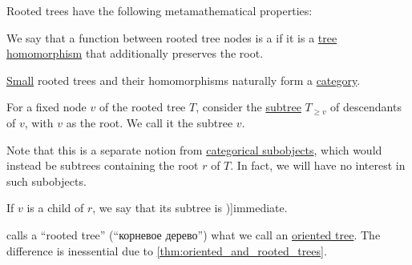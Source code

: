 \begin{definition}
  Rooted trees have the following metamathematical properties:
  \begin{thmenum}[resume=def:rooted_tree]
    \mimprovised We say that a function between rooted tree nodes is a  if it is a \hyperref[def:tree/morphism]{tree homomorphism} that additionally preserves the root.

     \hyperref[def:small_set]{Small} rooted trees and their homomorphisms naturally form a \hyperref[def:category]{category}.

     For a fixed node \( v \) of the rooted tree \( T \), consider the \hyperref[def:tree/subobject]{subtree} \( T_{\geq v} \) of descendants of \( v \), with \( v \) as the root. We call it the subtree  \( v \).

    Note that this is a separate notion from \hyperref[def:categorical_subobject]{categorical subobjects}, which would instead be subtrees containing the root \( r \) of \( T \). In fact, we will have no interest in such subobjects.

    If \( v \) is a child of \( r \), we say that its subtree is \term[en=subtree of the root (\cite[308]{Stanley2012EnumerativeCombinatoricsVol1})]{immediate}.
  \end{thmenum}
\end{definition}
\begin{comments}
  \item \Textcite[\S 9.2.1]{Новиков2013ДискретнаяМатематика} calls a \enquote{rooted tree} (\enquote{корневое дерево}) what we call an \hyperref[def:oriented_tree]{oriented tree}. The difference is inessential due to \cref{thm:oriented_and_rooted_trees}.
\end{comments}

